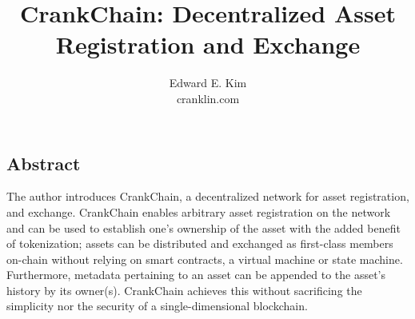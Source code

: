 \documentclass[10pt,twocolumn]{article}
\begin{document}
\title{CrankChain: Decentralized Asset Registration and Exchange}
\author{
{\normalsize Edward E. Kim}\\
\normalsize cranklin.com
}
\date{}

\maketitle
\subsection*{Abstract}
The author introduces CrankChain, a decentralized network for asset registration, and exchange.  CrankChain enables arbitrary asset registration on the network and can be used to establish one's ownership of the asset with the added benefit of tokenization; assets can be distributed and exchanged as first-class members on-chain without relying on smart contracts, a virtual machine or state machine.  Furthermore, metadata pertaining to an asset can be appended to the asset's history by its owner(s).  CrankChain achieves this without sacrificing the simplicity nor the security of a single-dimensional blockchain.
\end{document}
